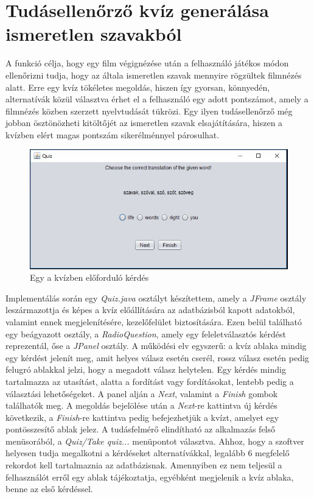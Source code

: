 \section{Tudásellenőrző kvíz generálása ismeretlen szavakból}

A funkció célja, hogy egy film végignézése után a felhasználó játékos módon ellenőrizni tudja, hogy az általa ismeretlen szavak mennyire rögzültek filmnézés alatt.
Erre egy kvíz tökéletes megoldás, hiszen így gyorsan, könnyedén, alternatívák közül választva érhet el a felhasználó egy adott pontszámot, amely a filmnézés közben szerzett nyelvtudását tükrözi. Egy ilyen tudásellenőrző még jobban ösztönözheti kitöltőjét az ismeretlen szavak elsajátítására, hiszen a kvízben elért magas pontszám sikerélménnyel párosulhat.

\begin{figure}
  \includegraphics[width=\linewidth]{images/quiz.jpg}
  \caption{Egy a kvízben előforduló kérdés}
  \label{fig:quiz}
\end{figure}

Implementálás során egy \textit{Quiz.java} osztályt készítettem, amely a \textit{JFrame} osztály leszármazottja és képes a kvíz előállítására az adatbázisból kapott adatokból, valamint ennek megjelenítésére, kezelőfelület biztosítására. Ezen belül található egy beágyazott osztály, a \textit{RadioQuestion}, amely egy feleletválasztós kérdést reprezentál, őse a \textit{JPanel} osztály. A működési elv egyszerű: a kvíz ablaka mindig egy kérdést jelenít meg, amit helyes válasz esetén cserél, rossz válasz esetén pedig felugró ablakkal jelzi, hogy a megadott válasz helytelen. Egy kérdés mindig tartalmazza az utasítást, alatta a fordítást vagy fordításokat, lentebb pedig a választási lehetőségeket. A panel alján a \textit{Next}, valamint a \textit{Finish} gombok találhatók meg. A megoldás bejelölése után a \textit{Next}-re kattintva új kérdés következik, a \textit{Finish}-re kattintva pedig befejezhetjük a kvízt, amelyet egy pontösszesítő ablak jelez. A tudásfelmérő elindítható az alkalmazás felső menüsorából, a \textit{Quiz/Take quiz...} menüpontot választva. Ahhoz, hogy a szoftver helyesen tudja megalkotni a kérdéseket alternatívákkal, legalább 6 megfelelő rekordot kell tartalmaznia az adatbázisnak. Amennyiben ez nem teljesül a felhasználót erről egy ablak tájékoztatja, egyébként megjelenik a kvíz ablaka, benne az első kérdéssel.

